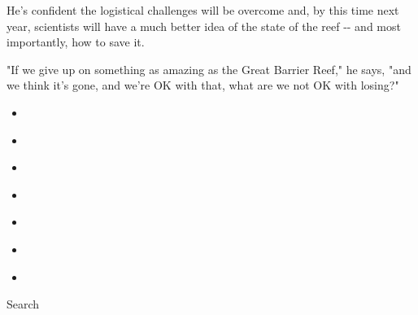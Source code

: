 He's confident the logistical challenges will be overcome and, by this
time next year, scientists will have a much better idea of the state of
the reef -\/- and most importantly, how to save it.

"If we give up on something as amazing as the Great Barrier Reef," he
says, "and we think it's gone, and we're OK with that, what are we not
OK with losing?"

\begin{itemize}
\item
\end{itemize}

\begin{itemize}
\item
\end{itemize}

\begin{itemize}
\item
\end{itemize}

\begin{itemize}
\item
\end{itemize}

\begin{itemize}
\item
\end{itemize}

\begin{itemize}
\item
\end{itemize}

\begin{itemize}
\item
\end{itemize}

Search

